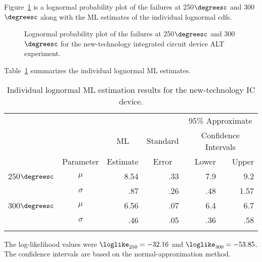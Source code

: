 \begin{example}
Figure~\ref{figure:icdevice02.groupi.lognor.ps} is a lognormal
probability plot of the failures at 250$\degreesc$ and
300$\degreesc$ along with the ML estimates of the individual
lognormal cdfs.
\begin{figure}
\caption{Lognormal
probability plot of the failures at 250$\degreesc$ and 300$\degreesc$
for the new-technology integrated circuit device ALT experiment.}
\label{figure:icdevice02.groupi.lognor.ps}
\end{figure}
Table~\ref{table:icdevice2.lognor.indiv.mles} summarizes the
individual lognormal ML estimates. 
\begin{table}
\caption{Individual lognormal ML estimation 
results for the new-technology IC device.}
\centering\small
\begin{tabular}{ccrrrr}
\\[-.5ex] \hline
 & & & & \multicolumn{2}{c}{95\% Approximate}\\ 
& &\multicolumn{1}{c}{ML}
&Standard & \multicolumn{2}{c}{Confidence Intervals}\\  \cline{5-6}
& Parameter & Estimate & \multicolumn{1}{c}{Error} & Lower & Upper \\
\hline 
250$\degreesc$ &$\mu $ & 8.54 & .33 &7.9 &9.2 \\[.7ex] 
 &$\sigma$ & .87 & .26 & .48 & 1.57 \\
\hline 
300$\degreesc$ &$\mu $ & 6.56 & .07 &6.4 &6.7 \\[.7ex] 
 	&$\sigma$ & .46 & .05 & .36 & .58 \\
\hline
\\[-1.8ex]
\end{tabular}
\begin{minipage}[t]{4in}
The log-likelihood values were $\loglike_{250}= -32.16$
and $\loglike_{300}= -53.85$. The confidence intervals 
are based on the normal-approximation method.
\end{minipage}
\label{table:icdevice2.lognor.indiv.mles}
\end{table}

\end{example}
